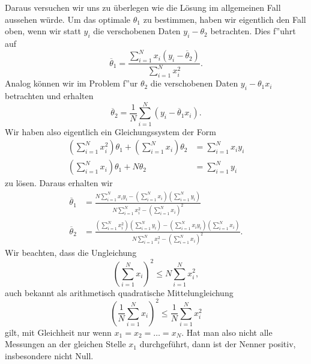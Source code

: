 Daraus versuchen wir uns zu überlegen wie die Lösung im allgemeinen Fall aussehen würde. Um das optimale \(\theta_1\) zu bestimmen, haben wir eigentlich den Fall oben, wenn wir statt \(y_i\) die verschobenen Daten \(y_i - \theta_2\) betrachten.
Dies f”uhrt auf
\begin{equation*}
 \overline{\theta}_1 = \frac{\sum_{i=1}^N  x_i (y_i-\overline{\theta}_2)}{\sum_{i=1}^N  x_i^2}.\end{equation*}
Analog können wir im Problem f”ur \(\theta_2\) die verschobenen Daten \(y_i - \theta_1 x_i\) betrachten und erhalten
\begin{equation*}
 \overline{\theta}_2 = \frac{1}N \sum_{i=1}^N   (y_i - \overline{\theta}_1 x_i).\end{equation*}
Wir haben also eigentlich ein Gleichungssystem der Form
\label{equation:vorkurs/regression:cecadb3a-3731-4682-ab77-516d581e0bb2}\begin{align}
(\sum_{i=1}^N x_i^2) \theta_1 + (\sum_{i=1}^N x_i) \theta_2 &= \sum_{i=1}^N x_i y_i \\
(\sum_{i=1}^N x_i) \theta_1 + N \theta_2 &= \sum_{i=1}^N y_i
\end{align}
zu lösen. Daraus erhalten wir
\label{equation:vorkurs/regression:4a1595a2-887c-40d5-a341-01f9c08dea66}\begin{align}
\overline{\theta}_1 &=  \frac{N \sum_{i=1}^N x_i y_i - (\sum_{i=1}^N x_i) (\sum_{i=1}^N y_i)}{N \sum_{i=1}^N x_i^2 - (\sum_{i=1}^N x_i)^2} \\
\overline{\theta}_2 &=  \frac{(\sum_{i=1}^N x_i^2) (\sum_{i=1}^N y_i) - (\sum_{i=1}^N x_i y_i) (\sum_{i=1}^N x_i)}{N \sum_{i=1}^N x_i^2 - (\sum_{i=1}^N x_i)^2}.
\end{align}
Wir beachten, dass die Ungleichung
\begin{equation*}
 (\sum_{i=1}^N x_i)^2 \leq N \sum_{i=1}^N x_i^2,\end{equation*}
auch bekannt als arithmetisch quadratische Mittelungleichung
\begin{equation*}
 (\frac{1}N \sum_{i=1}^N x_i)^2 \leq \frac{1}N  \sum_{i=1}^N x_i^2
\end{equation*}
gilt, mit Gleichheit nur wenn \(x_1=x_2=\ldots=x_N\). Hat man also nicht alle Messungen an der gleichen Stelle \(x_1\) durchgeführt, dann ist der Nenner positiv, insbesondere nicht Null.


